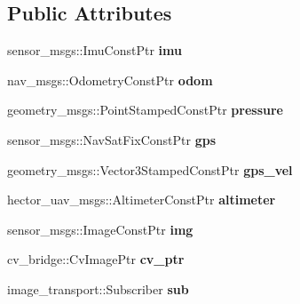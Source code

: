 \subsection*{Public Attributes}
\begin{DoxyCompactItemize}
\item 
\hypertarget{class_staterobot_ae6075d8fe1f2714e62f98ecfcfabab5f}{sensor\-\_\-msgs\-::\-Imu\-Const\-Ptr {\bfseries imu}}\label{class_staterobot_ae6075d8fe1f2714e62f98ecfcfabab5f}

\item 
\hypertarget{class_staterobot_a647d9af50a8896f64fa9456b5719157b}{nav\-\_\-msgs\-::\-Odometry\-Const\-Ptr {\bfseries odom}}\label{class_staterobot_a647d9af50a8896f64fa9456b5719157b}

\item 
\hypertarget{class_staterobot_a8ab2546d67712dbed7d288f66430d923}{geometry\-\_\-msgs\-::\-Point\-Stamped\-Const\-Ptr {\bfseries pressure}}\label{class_staterobot_a8ab2546d67712dbed7d288f66430d923}

\item 
\hypertarget{class_staterobot_aaade9f6f0d32fb6baaef1c745fa138de}{sensor\-\_\-msgs\-::\-Nav\-Sat\-Fix\-Const\-Ptr {\bfseries gps}}\label{class_staterobot_aaade9f6f0d32fb6baaef1c745fa138de}

\item 
\hypertarget{class_staterobot_a78d4a58c9335c40740c830f7d8499c75}{geometry\-\_\-msgs\-::\-Vector3\-Stamped\-Const\-Ptr {\bfseries gps\-\_\-vel}}\label{class_staterobot_a78d4a58c9335c40740c830f7d8499c75}

\item 
\hypertarget{class_staterobot_a08857351f3bb69c9590778240fcf2d78}{hector\-\_\-uav\-\_\-msgs\-::\-Altimeter\-Const\-Ptr {\bfseries altimeter}}\label{class_staterobot_a08857351f3bb69c9590778240fcf2d78}

\item 
\hypertarget{class_staterobot_abf4b6be91bd0f6be3a78ca438dc38ac2}{sensor\-\_\-msgs\-::\-Image\-Const\-Ptr {\bfseries img}}\label{class_staterobot_abf4b6be91bd0f6be3a78ca438dc38ac2}

\item 
\hypertarget{class_staterobot_aed9668b08e6c38c4008daa836fa88269}{cv\-\_\-bridge\-::\-Cv\-Image\-Ptr {\bfseries cv\-\_\-ptr}}\label{class_staterobot_aed9668b08e6c38c4008daa836fa88269}

\item 
\hypertarget{class_staterobot_a56690a2dc306e9147b373ac8f7145ffa}{image\-\_\-transport\-::\-Subscriber {\bfseries sub}}\label{class_staterobot_a56690a2dc306e9147b373ac8f7145ffa}


\end{DoxyCompactItemize}
